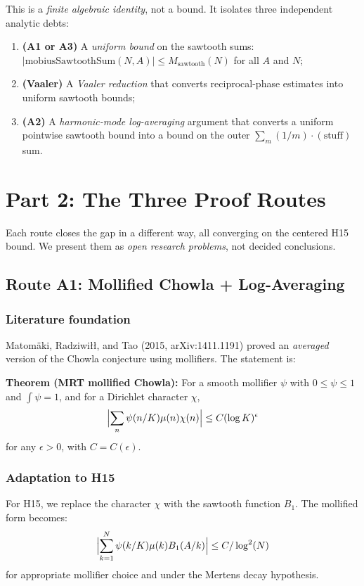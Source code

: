 \documentclass[11pt,a4paper]{article}
\begin{document}
This is a \emph{finite algebraic identity}, not a bound. It isolates three independent analytic debts:
\begin{enumerate}
\item \textbf{(A1 or A3)} A \emph{uniform bound} on the sawtooth sums: $|\text{mobiusSawtoothSum}(N,A)| \le M_{\text{sawtooth}}(N)$ for all $A$ and $N$;
\item \textbf{(Vaaler)} A \emph{Vaaler reduction} that converts reciprocal-phase estimates into uniform sawtooth bounds;
\item \textbf{(A2)} A \emph{harmonic-mode log-averaging} argument that converts a uniform pointwise sawtooth bound into a bound on the outer $\sum_m (1/m) \cdot (\text{stuff})$ sum.
\end{enumerate}

\section{Part 2: The Three Proof Routes}

Each route closes the gap in a different way, all converging on the centered H15 bound. We present them as \emph{open research problems}, not decided conclusions.

\subsection{Route A1: Mollified Chowla + Log-Averaging}

\subsubsection{Literature foundation}

Matomäki, Radziwiłł, and Tao (2015, arXiv:1411.1191) proved an \emph{averaged} version of the Chowla conjecture using mollifiers. The statement is:

\textbf{Theorem (MRT mollified Chowla):} For a smooth mollifier $\psi$ with $0 \le \psi \le 1$ and $\int \psi = 1$, and for a Dirichlet character $\chi$,
\[
\Bigl|\sum_{n} \psi(n/K) \mu(n) \chi(n)\Bigr| \le C (\log K)^\epsilon
\]
for any $\epsilon > 0$, with $C = C(\epsilon)$.

\subsubsection{Adaptation to H15}

For H15, we replace the character $\chi$ with the sawtooth function $B_1$. The mollified form becomes:
\[
\Bigl|\sum_{k=1}^{N} \psi(k/K) \mu(k) B_1(A/k)\Bigr| \le C / \log^2(N)
\]
for appropriate mollifier choice and under the Mertens decay hypothesis.
\end{document}
